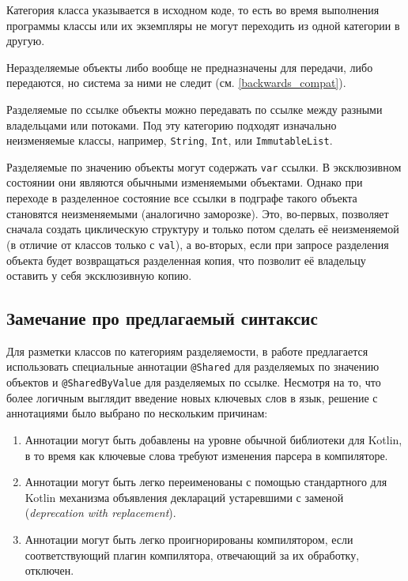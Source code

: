 \documentclass[specification,annotation,times]{itmo-student-thesis}
\begin{document}
Категория класса указывается в исходном коде, то есть во время выполнения программы классы или их экземпляры не могут переходить из одной категории в другую.

Неразделяемые объекты либо вообще не предназначены для передачи, либо передаются, но система за ними не следит (см. \ref{backwards_compat}).

Разделяемые по ссылке объекты можно передавать по ссылке между разными владельцами или потоками.
Под эту категорию подходят изначально неизменяемые классы, например, \texttt{String}, \texttt{Int}, или \texttt{ImmutableList}.

Разделяемые по значению объекты могут содержать \texttt{var} ссылки.
В эксклюзивном состоянии они являются обычными изменяемыми объектами.
Однако при переходе в разделенное состояние все ссылки в подграфе такого объекта становятся неизменяемыми (аналогично заморозке).
Это, во-первых, позволяет сначала создать циклическую структуру и только потом сделать её неизменяемой (в отличие от классов только с \texttt{val}),
а во-вторых, если при запросе разделения объекта будет возвращаться разделенная копия, что позволит её владельцу оставить у себя эксклюзивную копию.

\subsection{Замечание про предлагаемый синтаксис}\label{syntax_note}

Для разметки классов по категориям разделяемости, в работе предлагается использовать специальные аннотации \texttt{@Shared} для разделяемых по значению объектов и \texttt{@SharedByValue} для разделяемых по ссылке.
Несмотря на то, что более логичным выглядит введение новых ключевых слов в язык, решение с аннотациями было выбрано по нескольким причинам:

\begin{enumerate}
	\item Аннотации могут быть добавлены на уровне обычной библиотеки для Kotlin, в то время как ключевые слова требуют изменения парсера в компиляторе.
	\item Аннотации могут быть легко переименованы с помощью стандартного для Kotlin механизма объявления деклараций устаревшими с заменой (\textit{deprecation with replacement}).
	\item Аннотации могут быть легко проигнорированы компилятором, если соответствующий плагин компилятора, отвечающий за их обработку, отключен.
\end{enumerate}
\end{document}
